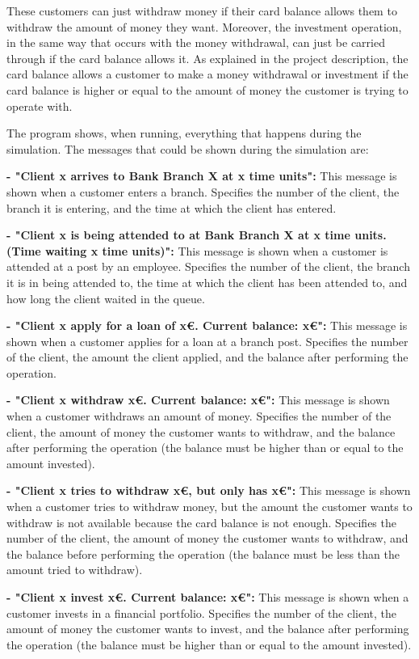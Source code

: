 \documentclass[titlepage, 12pt]{article}
\begin{document}
These customers can just withdraw money if their card balance allows them to withdraw the amount of money they want. Moreover, the investment operation, in the same way that occurs with the money withdrawal, can just be carried through if the card balance allows it. As explained in the project description, the card balance allows a customer to make a money withdrawal or investment if the card balance is higher or equal to the amount of money the customer is trying to operate with.

The program shows, when running, everything that happens during the simulation. The messages that could be shown during the simulation are:

\textbf{- "Client x arrives to Bank Branch X at x time units":} This message is shown when a customer enters a branch. Specifies the number of the client, the branch it is entering, and the time at which the client has entered.

\textbf{- "Client x is being attended to at Bank Branch X at x time units. (Time waiting x time units)":} This message is shown when a customer is attended at a post by an employee. Specifies the number of the client, the branch it is in being attended to, the time at which the client has been attended to, and how long the client waited in the queue.

\textbf{- "Client x apply for a loan of x€. Current balance: x€":} This message is shown when a customer applies for a loan at a branch post. Specifies the number of the client, the amount the client applied, and the balance after performing the operation.

\textbf{- "Client x withdraw x€. Current balance: x€":} This message is shown when a customer withdraws an amount of money. Specifies the number of the client, the amount of money the customer wants to withdraw, and the balance after performing the operation (the balance must be higher than or equal to the amount invested).

\textbf{- "Client x tries to withdraw x€, but only has x€":} This message is shown when a customer tries to withdraw money, but the amount the customer wants to withdraw is not available because the card balance is not enough. Specifies the number of the client, the amount of money the customer wants to withdraw, and the balance before performing the operation (the balance must be less than the amount tried to withdraw).

\textbf{- "Client x invest x€. Current balance: x€":} This message is shown when a customer invests in a financial portfolio. Specifies the number of the client, the amount of money the customer wants to invest, and the balance after performing the operation (the balance must be higher than or equal to the amount invested).
\end{document}
